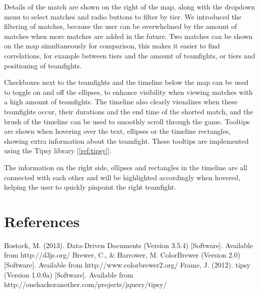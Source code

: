 \documentclass[11pt,twoside,a4paper]{article}
\begin{document}
Details of the match are shown on the right of the map, along with the dropdown menu to select matches and radio buttons to filter by tier. We introduced the filtering of matches, because the user can be overwhelmed by the amount of matches when more matches are added in the future. Two matches can be shown on the map simultaneously for comparison, this makes it easier to find correlations, for example between tiers and the amount of teamfights, or tiers and positioning of teamfights. 

Checkboxes next to the teamfights and the timeline below the map can be used to toggle on and off the ellipses, to enhance visibility when viewing matches with a high amount of teamfights. The timeline also clearly visualizes when these teamfights occur, their durations and the end time of the shorted match, and the brush of the timeline can be used to smoothly scroll through the game. Tooltips are shown when hovering over the text, ellipses or the timeline rectangles, showing extra information about the teamfight. These tooltips are implemented using the Tipsy library [\ref{ref:tipsy}].

The information on the right side, ellipses and rectangles in the timeline are all connected with each other and will be highlighted accordingly when hovered, helping the user to quickly pinpoint the right teamfight.



\section{References}
Bostock, M. (2013). Data-Driven Documents (Version 3.5.4) [Software]. Available from http://d3js.org/ \label{ref:d3}
\newline
Brewer, C., \& Harrower, M. ColorBrewer (Version 2.0) [Software]. Available from http://www.colorbrewer2.org/ \label{ref:colorbrewer}
\newline
Frame, J. (2012). tipsy (Version 1.0.0a) [Software]. Available from http://onehackoranother.com/projects/jquery/tipsy/ \label{ref:tipsy}
\end{document}
